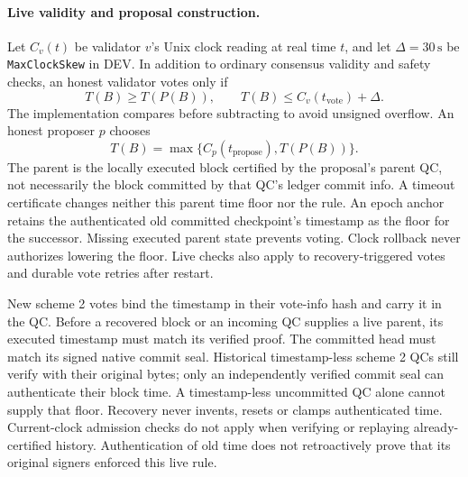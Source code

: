\paragraph{Live validity and proposal construction.}
Let $C_v(t)$ be validator $v$'s Unix clock reading at real time $t$, and let
$\Delta=30\,\mathrm{s}$ be \texttt{MaxClockSkew} in DEV. In addition to ordinary
consensus validity and safety checks, an honest validator votes only if
\[
  T(B) \geq T(P(B)), \qquad
  T(B) \leq C_v(t_{\mathrm{vote}})+\Delta.
\]
The implementation compares before subtracting to avoid unsigned overflow.
An honest proposer $p$ chooses
\[
  T(B)=\max\{C_p(t_{\mathrm{propose}}),T(P(B))\}.
\]
The parent is the locally executed block certified by the proposal's parent QC,
not necessarily the block committed by that QC's ledger commit info. A timeout
certificate changes neither this parent time floor nor the rule. An epoch anchor
retains the authenticated old committed checkpoint's timestamp as the floor for
the successor. Missing executed parent state prevents voting. Clock rollback
never authorizes lowering the floor. Live checks also apply to recovery-triggered
votes and durable vote retries after restart.

New scheme 2 votes bind the timestamp in their vote-info hash and carry it in the
QC. Before a recovered block or an incoming QC supplies a live parent, its
executed timestamp must match its verified proof. The committed head must match
its signed native commit seal. Historical timestamp-less scheme 2 QCs still
verify with their original bytes; only an independently verified commit seal
can authenticate their block time. A timestamp-less uncommitted QC alone cannot
supply that floor. Recovery never invents, resets or clamps authenticated time.
Current-clock admission checks do not apply when verifying or replaying
already-certified history. Authentication of old time does not retroactively
prove that its original signers enforced this live rule.

